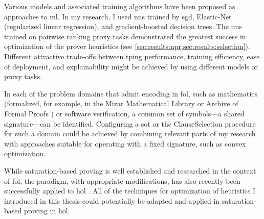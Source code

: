 
Various models and associated training algorithms have been proposed as approaches to \gls{ml}.
In my research, I used \glspl{nn} trained by \acrlong{sgd}, Elastic-Net (regularized linear regression), and gradient-boosted decision trees.
The \glspl{nn} trained on pairwise ranking proxy tasks demonstrated the greatest success in optimization of the prover heuristics (see \cref{sec:results:npr,sec:results:selection}).
Different attractive trade-offs between \gls{tping} performance, training efficiency, ease of deployment, and explainability might be achieved by using different models or proxy tasks.

In each of the problem domains that admit encoding in \gls{fol},
such as mathematics (formalized, for example, in the Mizar Mathematical Library \cite{DBLP:journals/jfrea/GrabowskiKN10,DBLP:journals/jar/Urban06} or Archive of Formal Proofs \cite{DBLP:conf/mkm/BlanchetteHMN15,DBLP:conf/itp/DesharnaisVBW22}) or software verification,
a common set of symbols---a shared signature---can be identified.
Configuring a \gls{sot} or the \gls{ClauseSelection} procedure
for such a domain could be achieved by combining relevant parts of my research with approaches suitable for operating with a fixed signature, such as convex optimization.

While saturation-based proving is well established and researched in the context of \gls{fol},
the paradigm, with appropriate modifications, has also recently been successfully applied to \gls{hol} \cite{DBLP:journals/ki/Steen20,DBLP:journals/jar/VukmirovicBBCNT22,DBLP:conf/ijcar/BhayatS24}.
All of the techniques for optimization of heuristics I introduced in this thesis could potentially be adapted and applied in saturation-based proving in \gls{hol}.

